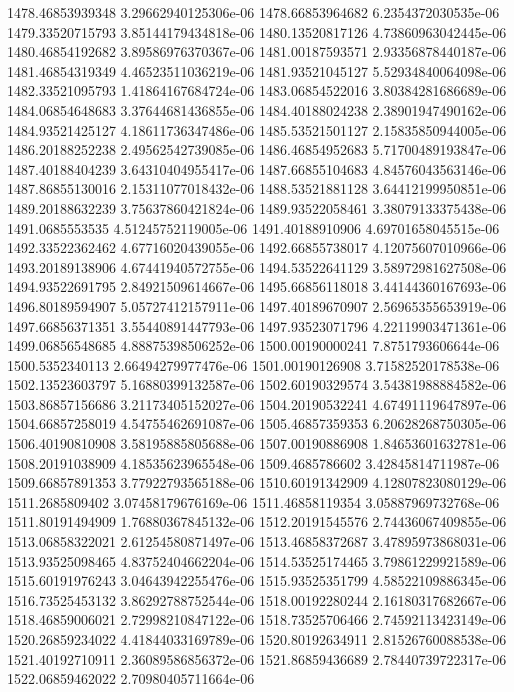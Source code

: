 {1478.46853939348 3.29662940125306e-06
1478.66853964682 6.2354372030535e-06
1479.33520715793 3.85144179434818e-06
1480.13520817126 4.73860963042445e-06
1480.46854192682 3.89586976370367e-06
1481.00187593571 2.93356878440187e-06
1481.46854319349 4.46523511036219e-06
1481.93521045127 5.52934840064098e-06
1482.33521095793 1.41864167684724e-06
1483.06854522016 3.80384281686689e-06
1484.06854648683 3.37644681436855e-06
1484.40188024238 2.38901947490162e-06
1484.93521425127 4.18611736347486e-06
1485.53521501127 2.15835850944005e-06
1486.20188252238 2.49562542739085e-06
1486.46854952683 5.71700489193847e-06
1487.40188404239 3.64310404955417e-06
1487.66855104683 4.84576043563146e-06
1487.86855130016 2.15311077018432e-06
1488.53521881128 3.64412199950851e-06
1489.20188632239 3.75637860421824e-06
1489.93522058461 3.38079133375438e-06
1491.0685553535 4.51245752119005e-06
1491.40188910906 4.69701658045515e-06
1492.33522362462 4.67716020439055e-06
1492.66855738017 4.12075607010966e-06
1493.20189138906 4.67441940572755e-06
1494.53522641129 3.58972981627508e-06
1494.93522691795 2.84921509614667e-06
1495.66856118018 3.44144360167693e-06
1496.80189594907 5.05727412157911e-06
1497.40189670907 2.56965355653919e-06
1497.66856371351 3.55440891447793e-06
1497.93523071796 4.22119903471361e-06
1499.06856548685 4.88875398506252e-06
1500.00190000241 7.8751793606644e-06
1500.5352340113 2.66494279977476e-06
1501.00190126908 3.71582520178538e-06
1502.13523603797 5.16880399132587e-06
1502.60190329574 3.54381988884582e-06
1503.86857156686 3.21173405152027e-06
1504.20190532241 4.67491119647897e-06
1504.66857258019 4.54755462691087e-06
1505.46857359353 6.20628268750305e-06
1506.40190810908 3.58195885805688e-06
1507.00190886908 1.84653601632781e-06
1508.20191038909 4.18535623965548e-06
1509.4685786602 3.42845814711987e-06
1509.66857891353 3.77922793565188e-06
1510.60191342909 4.12807823080129e-06
1511.2685809402 3.07458179676169e-06
1511.46858119354 3.05887969732768e-06
1511.80191494909 1.76880367845132e-06
1512.20191545576 2.74436067409855e-06
1513.06858322021 2.61254580871497e-06
1513.46858372687 3.47895973868031e-06
1513.93525098465 4.83752404662204e-06
1514.53525174465 3.79861229921589e-06
1515.60191976243 3.04643942255476e-06
1515.93525351799 4.58522109886345e-06
1516.73525453132 3.86292788752544e-06
1518.00192280244 2.16180317682667e-06
1518.46859006021 2.72998210847122e-06
1518.73525706466 2.74592113423149e-06
1520.26859234022 4.41844033169789e-06
1520.80192634911 2.81526760088538e-06
1521.40192710911 2.36089586856372e-06
1521.86859436689 2.78440739722317e-06
1522.06859462022 2.70980405711664e-06
}
